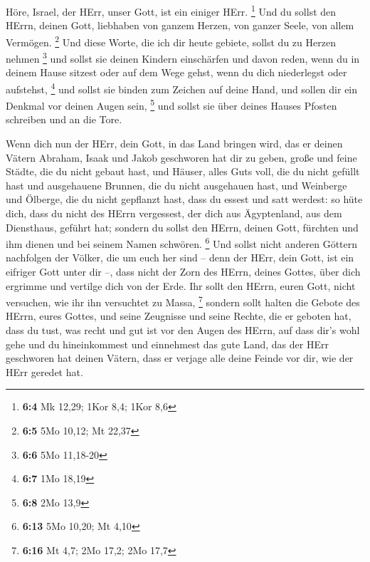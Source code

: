  Höre, Israel, der HErr, unser Gott, ist ein einiger HErr.
\footnote{\textbf{6:4} Mk 12,29; 1Kor 8,4; 1Kor 8,6}  Und du
sollst den HErrn, deinen Gott, liebhaben von ganzem Herzen, von ganzer
Seele, von allem Vermögen. \footnote{\textbf{6:5} 5Mo 10,12; Mt 22,37}
 Und diese Worte, die ich dir heute gebiete, sollst du zu
Herzen nehmen \footnote{\textbf{6:6} 5Mo 11,18-20}  und
sollst sie deinen Kindern einschärfen und davon reden, wenn du in deinem
Hause sitzest oder auf dem Wege gehst, wenn du dich niederlegst oder
aufstehst, \footnote{\textbf{6:7} 1Mo 18,19}  und sollst sie
binden zum Zeichen auf deine Hand, und sollen dir ein Denkmal vor deinen
Augen sein, \footnote{\textbf{6:8} 2Mo 13,9}  und sollst sie
über deines Hauses Pfosten schreiben und an die Tore.

 Wenn dich nun der HErr, dein Gott, in das Land bringen
wird, das er deinen Vätern Abraham, Isaak und Jakob geschworen hat dir
zu geben, große und feine Städte, die du nicht gebaut hast,
 und Häuser, alles Guts voll, die du nicht gefüllt hast und
ausgehauene Brunnen, die du nicht ausgehauen hast, und Weinberge und
Ölberge, die du nicht gepflanzt hast, dass du essest und satt werdest:
 so hüte dich, dass du nicht des HErrn vergessest, der dich
aus Ägyptenland, aus dem Diensthaus, geführt hat;  sondern
du sollst den HErrn, deinen Gott, fürchten und ihm dienen und bei seinem
Namen schwören. \footnote{\textbf{6:13} 5Mo 10,20; Mt 4,10}
 Und sollst nicht anderen Göttern nachfolgen der Völker,
die um euch her sind --  denn der HErr, dein Gott, ist ein
eifriger Gott unter dir --, dass nicht der Zorn des HErrn, deines
Gottes, über dich ergrimme und vertilge dich von der Erde. 
Ihr sollt den HErrn, euren Gott, nicht versuchen, wie ihr ihn versuchtet
zu Massa, \footnote{\textbf{6:16} Mt 4,7; 2Mo 17,2; 2Mo 17,7}
 sondern sollt halten die Gebote des HErrn, eures Gottes,
und seine Zeugnisse und seine Rechte, die er geboten hat, 
dass du tust, was recht und gut ist vor den Augen des HErrn, auf dass
dir's wohl gehe und du hineinkommest und einnehmest das gute Land, das
der HErr geschworen hat deinen Vätern,  dass er verjage
alle deine Feinde vor dir, wie der HErr geredet hat.


